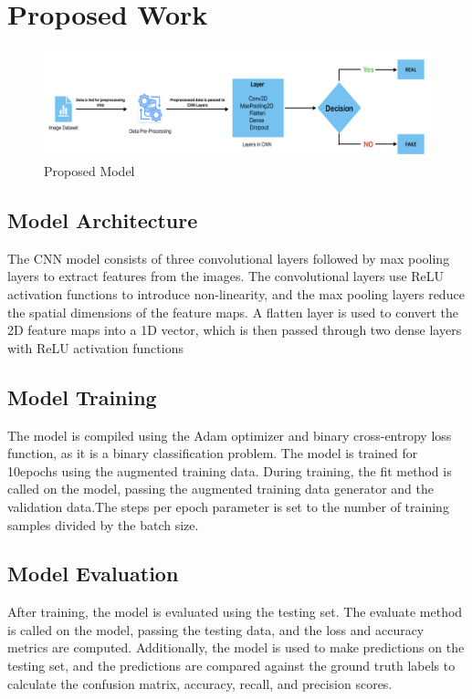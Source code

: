 \section{Proposed Work}

\begin{figure}[h]
    \centering
    \includegraphics[width=1\textwidth]{figures/proposed_model.png}
    \caption{Proposed Model}
    \label{fig:enter-label}
\end{figure}

\subsection{Model Architecture}

The CNN model consists of three convolutional layers followed by max pooling layers to
extract features from the images. The convolutional layers use ReLU activation functions
to introduce non-linearity, and the max pooling layers reduce the spatial dimensions of
the feature maps. A flatten layer is used to convert the 2D feature maps into a 1D vector,
which is then passed through two dense layers with ReLU activation functions
\subsection{Model Training}

The model is compiled using the Adam optimizer and binary cross-entropy loss
function, as it is a binary classification problem. The model is trained for 10epochs using the augmented training data. During training, the fit method is called on the model, passing the augmented training data generator and the
validation data.The steps per epoch parameter is set to the number of training samples divided by the batch size.
\subsection{Model Evaluation}
After training, the model is evaluated using the testing set. The evaluate
method is called on the model, passing the testing data, and the loss and
accuracy metrics are computed. Additionally, the model is used to make
predictions on the testing set, and the predictions are compared against the
ground truth labels to calculate the confusion matrix, accuracy, recall, and
precision scores.
